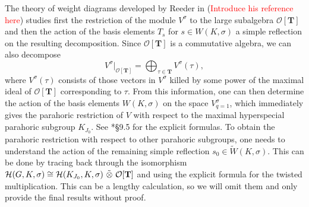 The theory of weight diagrams developed by Reeder in (\textcolor{red}{Introduce his reference here}) studies first the restriction of the module $V^\sigma$ to the large subalgebra $\mathcal{O}[\mathbf{T}]$ and then the action of the basis elements $T_s$ for  $s\in W(K,\sigma)$ a simple reflection on the resulting decomposition. Since $\mathcal{O}[\mathbf{T}]$ is a commutative algebra, we can also decompose
$$V^\sigma|_{\mathcal{O}[\mathbf{T}]}=\bigoplus_{\tau\in\mathbf{T}}V^\sigma(\tau),$$
where $V^\sigma(\tau)$ consists of those vectors in $V^\sigma$ killed by some power of the maximal ideal of $\mathcal{O}[\mathbf{T}]$ corresponding to $\tau$. From this information, one can then determine the action of the basis elements $W(K,\sigma)$ on the space $V^\sigma_{q=1}$, which immediately gives the parahoric restriction of $V$ with respect to the maximal hyperspecial parahoric subgroup $K_{J_0}$. See \cite{Reeder2000}*{\S 9.5} for the explicit formulas. To obtain the parahoric restriction with respect to other parahoric subgroups, one needs to understand the action of the remaining simple reflection $s_0\in\tilde{W}(K,\sigma)$. This can be done by tracing back through the isomorphism $\cH(G,K,\sigma)\cong\cH(K_{J_0},K,\sigma)\ \tilde\otimes\ \mathcal{O}[\mathbf{T}]$ and using the explicit formula for the twisted multiplication. This can be a lengthy calculation, so we will omit them and only provide the final results without proof. 

